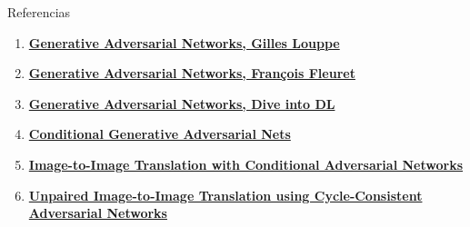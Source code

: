 \documentclass[aspectratio=169]{beamer}
\begin{document}



\begin{frame}[t]{Referencias}
\begin{enumerate}
	\item \href{https://glouppe.github.io/info8010-deep-learning/?p=archives-lecture-gan.md}{\textbf{Generative Adversarial Networks, Gilles Louppe}}
	\item \href{https://fleuret.org/dlc/materials/dlc-slides-11-1-GAN.pdf}{\textbf{Generative Adversarial Networks, François Fleuret}}
	\item \href{https://d2l.ai/chapter_generative-adversarial-networks/gan.html}{\textbf{Generative Adversarial Networks, Dive into DL}}
	\item \href{https://arxiv.org/pdf/1411.1784.pdf}{\textbf{Conditional Generative Adversarial Nets}}
	\item \href{https://arxiv.org/pdf/1611.07004.pdf}{\textbf{Image-to-Image Translation with Conditional Adversarial Networks}}
	\item \href{https://arxiv.org/pdf/1703.10593.pdf}{\textbf{Unpaired Image-to-Image Translation using Cycle-Consistent Adversarial Networks}}
\end{enumerate}
\end{frame}
\end{document}
